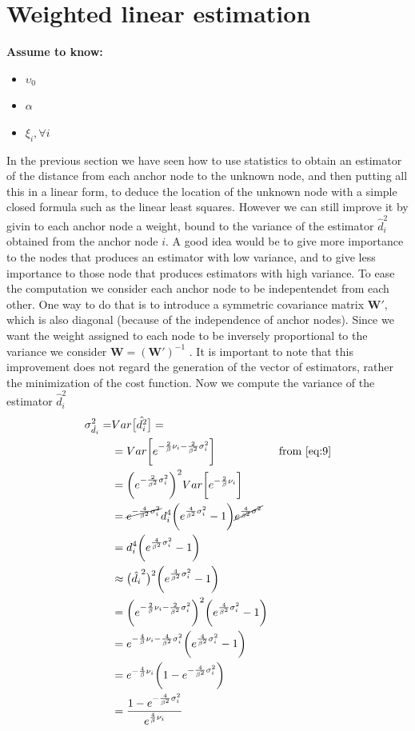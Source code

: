 \documentclass[12pt,twoside]{report}
\begin{document}
\section{Weighted linear estimation}
  \begin{center}
  \textbf{Assume to know:}
  \begin{itemize}
    \centering
    \item $\upsilon_0$
    \item $\alpha$
    \item $\xi_i,\forall i$
  \end{itemize}
  \end{center}
In the previous section we have seen how to use statistics to obtain an estimator of the distance from each anchor node to the unknown node, and then putting all this in a linear form, to deduce the location of the unknown node with a simple closed formula such as the linear least squares. However we can still improve it by givin to each anchor node a weight, bound to the variance of the estimator $\hat{d}_i^2$ obtained from the anchor node $i$. A good idea would be to give more importance to the nodes that produces an estimator with low variance, and to give less importance to those node that produces estimators with high variance. To ease the computation we consider each anchor node to be indepentendet from each other. One way to do that is to introduce a symmetric covariance matrix $\mathbf{W}'$, which is also diagonal (because of the independence of anchor nodes). Since we want the weight assigned to each node to be inversely proportional to the variance we consider $\mathbf{W}=(\mathbf{W}')^{-1}$ \cite{rzk,899498y4hd}. It is important to note that this improvement does not regard the generation of the vector of estimators, rather the minimization of the cost function. Now we compute the variance of the estimator $\hat{d}_i^2$
\begin{align}
\sigma^2_{\hat{d_i}}=&Var\big[\hat{d_i^2}\big]=&& \\
&=Var\bigg[e^{-\frac{2}{\beta}\nu_i-\frac{2}{\beta^2}\sigma^2_i}\bigg] && \text{from \ref{eq:9}}\\
&=\bigg(e^{-\frac{2}{\beta^2}\sigma^2_i}\bigg)^2Var\bigg[e^{-\frac{2}{\beta}\nu_i}\bigg]\\
&=\cancel{e^{-\frac{4}{\beta^2}\sigma^2_i}}d_i^4\bigg(e^{\frac{4}{\beta^2}\sigma_i^2}-1\bigg)\cancel{e^{\frac{4}{\beta^2}\sigma^2}}\\
&=d_i^4\bigg(e^{\frac{4}{\beta^2}\sigma_i^2}-1\bigg)\\
&\approx \big(\hat{d_i}^2\big)^2\bigg(e^{\frac{4}{\beta^2}\sigma_i^2}-1\bigg)\\
&=\bigg(e^{-\frac{2}{\beta}\nu_i-\frac{2}{\beta^2}\sigma^2_i}\bigg)^2\bigg(e^{\frac{4}{\beta^2}\sigma_i^2}-1\bigg)\\
&=e^{-\frac{4}{\beta}\nu_i-\frac{4}{\beta^2}\sigma^2_i}\bigg(e^{\frac{4}{\beta^2}\sigma^2_i}-1\bigg)\\
&=e^{-\frac{4}{\beta}\nu_i}\bigg(1-e^{-\frac{4}{\beta^2}\sigma^2_i}\bigg)\\
&=\frac{1-e^{-\frac{4}{\beta^2}\sigma^2_i}}{e^{\frac{4}{\beta}\nu_i}}
\end{align}
\end{document}

